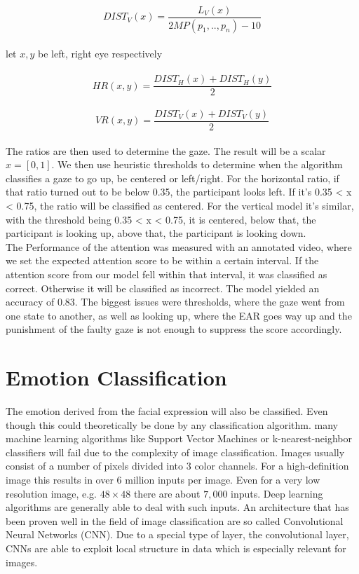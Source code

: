 \documentclass{article}
\begin{document}
\\
\begin{equation}
DIST_V(x) = \frac{L_V(x)}{2MP(p_1,..,p_n)-10}
\end{equation}
\\
let $x,y$ be left, right eye respectively\\
\\
\begin{equation}
HR(x,y) = \frac{DIST_H(x)+DIST_H(y)}{2}
\end{equation}
\\
\begin{equation}
VR(x,y) = \frac{DIST_V(x)+DIST_V(y)}{2}
\end{equation}
\\

The ratios are then used to determine the gaze. The result will be a scalar $x= [0,1]$. We then use heuristic thresholds to determine when the algorithm classifies a gaze to go up, be centered or left/right. For the horizontal ratio, if that ratio turned out to be below 0.35, the participant looks left. If it’s 0.35 < x < 0.75, the ratio will be classified as centered. For the vertical model it’s similar, with the threshold being 0.35 < x < 0.75, it is centered, below that, the participant is looking up, above that, the participant is looking down. \newline
\\
The Performance of the attention was measured with an annotated video, where we set the expected attention score to be within a certain interval. If the attention score from our model fell within that interval, it was classified as correct. Otherwise it will be classified as incorrect. The model yielded an accuracy of 0.83. The biggest issues were thresholds, where the gaze went from one state to another, as well as looking up, where the EAR goes way up and the punishment of the faulty gaze is not enough to suppress the score accordingly.
\section{Emotion Classification}
The emotion derived from the facial expression will also be classified. Even though this could theoretically be done by any classification algorithm. many machine learning algorithms like Support Vector Machines or k-nearest-neighbor classifiers will fail due to the complexity of image classification. Images usually consist of a number of pixels divided into $3$ color channels. For a high-definition image this results in over $6$ million inputs per image. Even for a very low resolution image, e.g. $48 \times 48$ there are about $7,000$ inputs. Deep learning algorithms are generally able to deal with such inputs. An architecture that has been proven well in the field of image classification are so called Convolutional Neural Networks (CNN). Due to a special type of layer, the convolutional layer, CNNs are able to exploit local structure in data which is especially relevant for images.
\end{document}
